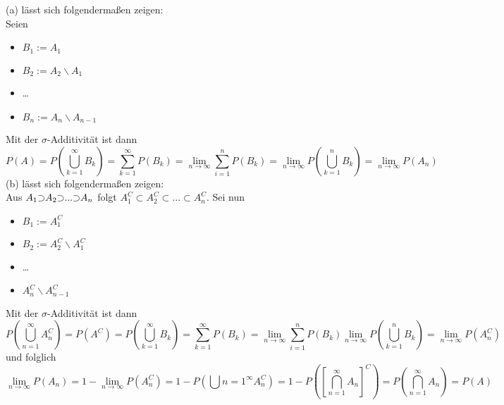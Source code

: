 \documentclass[a4paper,12pt]{article}
\begin{document}
(a) lässt sich folgendermaßen zeigen:\\
Seien
\begin{itemize}
    \item $B_1:= A_1$
    \item $B_2:= A_2 \backslash A_1$
    \item \dots
    \item $B_n:= A_n \backslash A_{n-1}$
\end{itemize}
Mit der $\sigma$-Additivität ist dann 
$$
P(A) = P \left( \bigcup_{k=1}^\infty B_k \right) = \sum_{k=1}^{\infty} P(B_k) = \lim_{n \to \infty} \sum_{i=1}^{n} P(B_k) = \lim_{n \to \infty} P \left( \bigcup_{k=1}^n B_k \right) = \lim_{n \to \infty} P(A_n)
$$
(b) lässt sich folgendermaßen zeigen:\\
Aus $ A_1 \reflectbox{$\subset$} A_2 \reflectbox{$\subset$} ... \reflectbox{$\subset$} A_n $ folgt $A_1^C \subset A_2^C \subset ... \subset A_n^C $. Sei nun
\begin{itemize}
    \item $B_1:= A_1^C$
    \item $B_2:= A_2^C \backslash A_1^C$
    \item \dots
    \item $A_n^C \backslash A_{n-1}^C$
\end{itemize}
Mit der $\sigma$-Additivität ist dann
$$
P \left(\bigcup_{n=1}^\infty A_n^C\right) = P(A^C) = P \left( \bigcup_{k=1}^\infty B_k \right) = \sum_{k=1}^{\infty} P(B_k) = \lim_{n \to \infty} \sum_{i=1}^{n} P(B_k) \lim_{n \to \infty} P \left( \bigcup_{k=1}^n B_k \right) = \lim_{n \to \infty} P(A_n^C)
$$
und folglich 
$$
\lim_{n \to \infty}P(A_n) = 1 - \lim_{n \to \infty}P(A_n^C) = 1 - P \left( \bigcup{n=1}^\infty A_n^C \right) = 1 - P \left( \left[\bigcap_{n=1}^\infty A_n  \right]^C \right) = P \left(\bigcap_{n=1}^\infty A_n \right) = P(A)
$$
\end{document}
